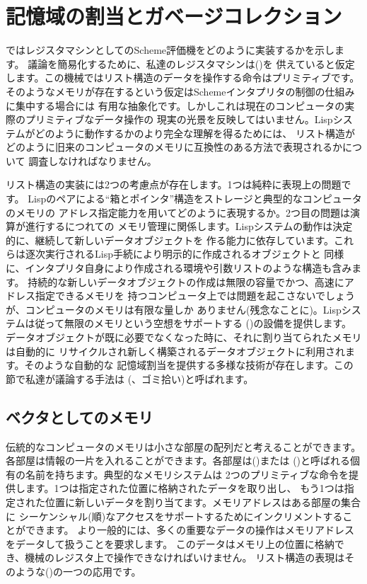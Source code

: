 \section{記憶域の割当とガベージコレクション}
\label{Section 5.3}

ではレジスタマシンとしてのScheme評価機をどのように実装するかを示します。
議論を簡易化するために、私達のレジスタマシンは()を
供えていると仮定します。この機械ではリスト構造のデータを操作する命令はプリミティブです。
そのようなメモリが存在するという仮定はSchemeインタプリタの制御の仕組みに集中する場合には
有用な抽象化です。しかしこれは現在のコンピュータの実際のプリミティブなデータ操作の
現実の光景を反映してはいません。Lispシステムがどのように動作するかのより完全な理解を得るためには、
リスト構造がどのように旧来のコンピュータのメモリに互換性のある方法で表現されるかについて
調査しなければなりません。

リスト構造の実装には2つの考慮点が存在します。1つは純粋に表現上の問題です。
Lispのペアによる``箱とポインタ''構造をストレージと典型的なコンピュータのメモリの
アドレス指定能力を用いてどのように表現するか。2つ目の問題は演算が進行するにつれての
メモリ管理に関係します。Lispシステムの動作は決定的に、継続して新しいデータオブジェクトを
作る能力に依存しています。これらは逐次実行されるLisp手続により明示的に作成されるオブジェクトと
同様に、インタプリタ自身により作成される環境や引数リストのような構造も含みます。
持続的な新しいデータオブジェクトの作成は無限の容量でかつ、高速にアドレス指定できるメモリを
持つコンピュータ上では問題を起こさないでしょうが、コンピュータのメモリは有限な量しか
ありません(残念なことに)。Lispシステムは従って無限のメモリという空想をサポートする
()の設備を提供します。
データオブジェクトが既に必要でなくなった時に、それに割り当てられたメモリは自動的に
リサイクルされ新しく構築されるデータオブジェクトに利用されます。そのような自動的な
記憶域割当を提供する多様な技術が存在します。この節で私達が議論する手法は
(、ゴミ拾い)と呼ばれます。



\subsection{ベクタとしてのメモリ}
\label{Section 5.3.1}

伝統的なコンピュータのメモリは小さな部屋の配列だと考えることができます。
各部屋は情報の一片を入れることができます。各部屋は()または
()と呼ばれる個有の名前を持ちます。典型的なメモリシステムは
2つのプリミティブな命令を提供します。1つは指定された位置に格納されたデータを取り出し、
もう1つは指定された位置に新しいデータを割り当てます。メモリアドレスはある部屋の集合に
シーケンシャル(順)なアクセスをサポートするためにインクリメントすることができます。
より一般的には、多くの重要なデータの操作はメモリアドレスをデータして扱うことを要求します。
このデータはメモリ上の位置に格納でき、機械のレジスタ上で操作できなければいけません。
リスト構造の表現はそのような()の一つの応用です。

